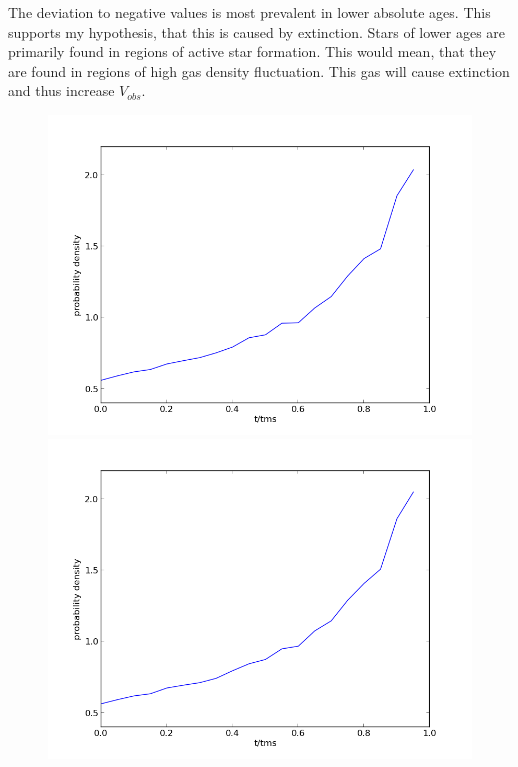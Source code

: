 \documentclass[a4paper,10pt]{article}
\begin{document}
 
 The deviation to negative values is most prevalent in lower absolute ages. This supports my hypothesis, that this is caused by 
 extinction. Stars of lower ages are primarily found in regions of active star formation. This would mean, that they are found in regions
 of high gas density fluctuation. This gas will cause extinction and thus increase $V_{obs}$.
 
 
 \begin{figure}[h!]
  \begin{minipage}{0.49\textwidth}
   \includegraphics[width=\textwidth]{100-100-100}
  \end{minipage}
  \begin{minipage}{0.49\textwidth}
   \includegraphics[width=\textwidth]{10-100-100}

\end{minipage}
\end{figure}
\end{document}
